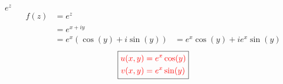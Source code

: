 \item[6.] $e^z$
\begin{align*}
    f(z) 
    &= e^z \\
    &= e^{x+iy}\\
    &= e^x(\cos(y)+i\sin(y))
    &= e^x\cos(y)+ie^x\sin(y)
\end{align*}
\[
\boxed{
\textcolor{red}{
\begin{aligned}
u(x,y) &= e^x\cos(y) \\
v(x,y) &= e^x\sin(y)
\end{aligned}
}
}
\]
